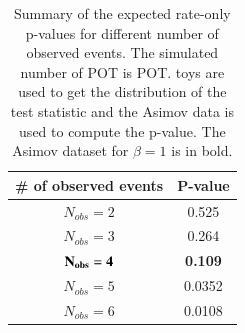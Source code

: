 

\begin{table}
\centering
\begin{tabular}{| c | c |}
\hline
\# of observed events	                                          	& P-value    		    	\\
\hline
$N_{obs} = 2$      		                    	& 0.525                    	\\
$ N_{obs} = 3$      		                    	& 0.264                     	\\
$ \bf N_{obs} = 4$      		                 & \bf 0.109                      	\\
$N_{obs} = 5$      		                    	& 0.0352                      	\\
$N_{obs} = 6$      		                    	& 0.0108                     	\\
\hline
\end{tabular}
\caption{
Summary of the expected rate-only p-values for different number of 
observed events. The simulated number of POT is 
\TotalPot POT.
\NumToysLarge toys are used to get the distribution of the test statistic and the 
Asimov data is used to compute the p-value.
The Asimov dataset for $\beta=1$ is in bold.
}
\label{tab:summary_sensi_rateonly_highpot}
\end{table}





